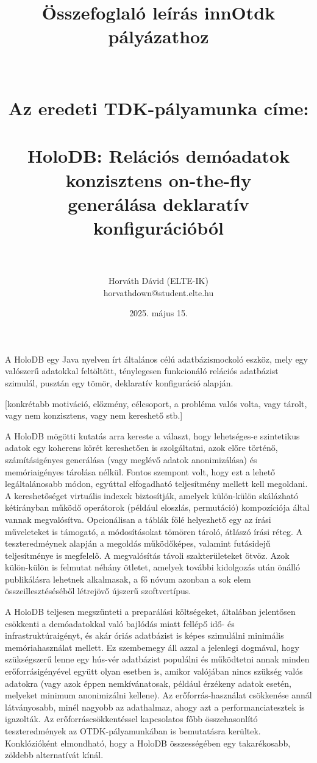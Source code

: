 \documentclass[12pt]{article}
\title{Összefoglaló leírás innOtdk pályázathoz \\ ~ \\ ~ \\ {\Large Az eredeti TDK-pályamunka címe: \\ ~ \\ HoloDB: Relációs demóadatok konzisztens on-the-fly \\ generálása deklaratív konfigurációból} \\ ~}
\author{Horváth Dávid (ELTE-IK) \\ horvathdown@student.elte.hu}
\date{2025. május 15.}
\begin{document}
\begin{titlepage}
\maketitle
\thispagestyle{empty}
\end{titlepage}

\cleardoublepage

A HoloDB egy Java nyelven írt általános célú adatbázismockoló eszköz, mely egy valószerű adatokkal feltöltött, ténylegesen funkcionáló relációs adatbázist szimulál, pusztán egy tömör, deklaratív konfiguráció alapján.

[konkrétabb motiváció, előzmény, célcsoport, a probléma valós volta, vagy tárolt, vagy nem konzisztens, vagy nem kereshető stb.]

A HoloDB mögötti kutatás arra kereste a választ, hogy lehetséges-e szintetikus adatok egy koherens körét kereshetően is szolgáltatni, azok előre történő, számításigényes generálása (vagy meglévő adatok anonimizálása) és memóriaigényes tárolása nélkül. Fontos szempont volt, hogy ezt a lehető legáltalánosabb módon, egyúttal elfogadható teljesítmény mellett kell megoldani.
A kereshetőséget virtuális indexek biztosítják, amelyek külön-külön skálázható kétirányban működő operátorok (például eloszlás, permutáció) kompozíciója által vannak megvalósítva.
Opcionálisan a táblák fölé helyezhető egy az írási műveleteket is támogató, a módosításokat tömören tároló, átlászó írási réteg.
A teszteredméynek alapján a megoldás működőképes, valamint futásidejű teljesítménye is megfelelő.
A megvalósítás távoli szakterületeket ötvöz. Azok külön-külön is felmutat néhány ötletet, amelyek további kidolgozás után önálló publikálásra lehetnek alkalmasak, a fő nóvum azonban a sok elem összeillesztéséséből létrejövő újszerű szoftvertípus.

A HoloDB teljesen megszünteti a preparálási költségeket, általában jelentősen csökkenti a demóadatokkal való bajlódás miatt fellépő idő- és infrastruktúraigényt, és akár óriás adatbázist is képes szimulálni minimális memóriahasználat mellett.
Ez szembemegy áll azzal a jelenlegi dogmával, hogy szükségszerű lenne egy hús-vér adatbázist populálni és működtetni annak minden erőforrásigényével együtt olyan esetben is, amikor valójában nincs szükség valós adatokra (vagy azok éppen nemkívánatosak, például érzékeny adatok esetén, melyeket minimum anonimizálni kellene).
Az erőforrás-használat csökkenése annál látványosabb, minél nagyobb az adathalmaz, ahogy azt a performanciatesztek is igazolták.
Az erőforráscsökkentéssel kapcsolatos főbb összehasonlító teszteredmények az OTDK-pályamunkában is bemutatásra kerültek.
Konklózióként elmondható, hogy a HoloDB összességében egy takarékosabb, zöldebb alternatívát kínál.
\end{document}
